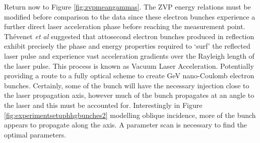Return now to Figure \ref{fig:zvpmeangammas}. The ZVP energy relations must be modified before comparison to the data since these electron bunches experience a further direct laser acceleration phase before reaching the measurement point. Thévenet \textit{et al} \cite{thevenetVacuumLaserAcceleration2016} suggested that attosecond electron bunches produced in reflection exhibit precisely the phase and energy properties required to `surf' the reflected laser pulse and experience vast acceleration gradients over the Rayleigh length of the laser pulse. This process is known as Vacuum Laser Acceleration. Potentially providing a route to a fully optical scheme to create GeV nano-Coulomb electron bunches. Certainly, some of the bunch will have the necessary injection close to the laser propagation axis, however much of the bunch propagates at an angle to the laser and this must be accounted for. Interestingly in Figure \ref{fig:experimentsetuphhgbunches2} modelling oblique incidence, more of the bunch appears to propagate along the axis. A parameter scan is necessary to find the optimal parameters.

